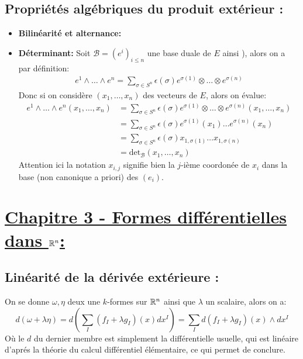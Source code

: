    \subsection*{Propriétés algébriques du produit extérieur {:}}
      \begin{itemize}
         \item \textbf{Bilinéarité et alternance:}
         \item \textbf{Déterminant:} Soit \( \mathcal{B} = (e^i)_{i \leq n} \) une base duale de \( E \) ainsi ), alors on a par définition:
         \begin{align*}
            e^1 \wedge \ldots \wedge e^n = \sum_{\sigma \in S^n} \epsilon(\sigma) e^{\sigma(1)} \otimes \ldots \otimes e^{\sigma(n)}
         \end{align*}
         Donc si on considère \( (x_1, \ldots, x_n) \) des vecteurs de \( E \), alors on évalue:
         \begin{align*}
            e^1 \wedge \ldots \wedge e^n(x_1, \ldots, x_n) &= \sum_{\sigma \in S^n} \epsilon(\sigma) e^{\sigma(1)} \otimes \ldots \otimes e^{\sigma(n)}(x_1, \ldots, x_n)\\
            &= \sum_{\sigma \in S^n} \epsilon(\sigma) e^{\sigma(1)}(x_1) \ldots e^{\sigma(n)}(x_n)\\
            &= \sum_{\sigma \in S^n} \epsilon(\sigma) x_{1, \sigma(1)} \ldots x_{1, \sigma(n)}\\
            &= \text{det}_\mathcal{B}(x_1, \ldots, x_n)
         \end{align*}
         Attention ici la notation \( x_{i,j} \) signifie bien la \( j \)-ième coordonée de \( x_i \) dans la base (non canonique a priori) des \( (e_i) \).
\end{itemize}

\pagebreak

\section*{\uline{Chapitre 3 - Formes différentielles dans \( \mathbb{R}^n \){:}}}
   \subsection*{Linéarité de la dérivée extérieure {:}}
   On se donne \( \omega, \eta \) deux une \( k \)-formes sur \( \mathbb{R}^n \) ainsi que \( \lambda \) un scalaire, alors on a:
   \[ 
      d( \omega + \lambda\eta) = d\left( \sum_I (f_I + \lambda g_I)(x) dx^I\right) = \sum_I d(f_I + \lambda g_I)(x) \wedge dx^I
   \]
   Où le \( d \) du dernier membre est simplement la différentielle usuelle, qui est linéaire d'aprés la théorie du calcul différentiel élémentaire, ce qui permet de conclure.
